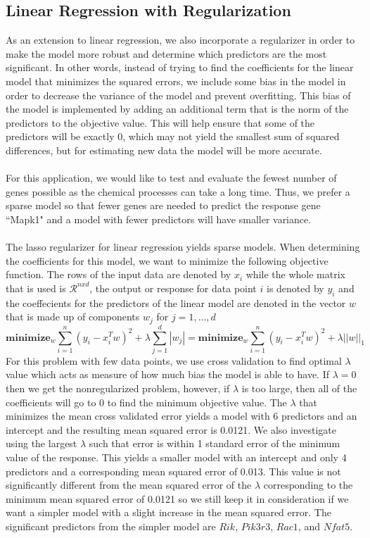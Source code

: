 \documentclass{article}
\begin{document}
\subsection{Linear Regression with Regularization}
As an extension to linear regression, we also incorporate a regularizer in order to make the model more robust and determine which predictors are the most significant.  In other words, instead of trying to find the coefficients for the linear model that minimizes the squared errors, we include some bias in the model in order to decrease the variance of the model and prevent overfitting.  This bias of the model is implemented by adding an additional term that is the norm of the predictors to the objective value. This will help ensure that some of the predictors will be exactly $0$, which may not yield the smallest sum of squared differences, but for estimating new data the model will be more accurate. \\
\null\\
For this application, we would like to test and evaluate the fewest number of genes possible as the chemical processes can take a long time.  Thus, we prefer a sparse model so that fewer genes are needed to predict the response gene ``Mapk1" and a model with fewer predictors will have smaller variance.\\
\null\\
The lasso regularizer for linear regression yields sparse models.  When determining the coefficients for this model, we want to minimize the following objective function.  The rows of the input data are denoted by $x_i$ while the whole matrix that is used is $\mathcal{R}^{nxd}$, the output or response for data point $i$ is denoted by $y_i$ and the coeffecients for the predictors of the linear model are denoted in the vector $w$ that is made up of components $w_j$ for $j=1,\dots,d$
\begin{equation}
	\textbf{minimize}_w \sum_{i=1}^n(y_i-x_i^Tw)^2+\lambda\sum_{j=1}^d |w_j| = \textbf{minimize}_w \sum_{i=1}^n(y_i-x_i^Tw)^2+\lambda||w||_1
\end{equation}
For this problem with few data points, we use cross validation to find optimal $\lambda$ value which acts as measure of how much bias the model is able to have.  If $\lambda = 0$ then we get the nonregularized problem, however, if $\lambda$ is too large, then all of the coefficients will go to $0$ to find the minimum objective value.  The $\lambda$ that minimizes the mean cross validated error yields a model with 6 predictors and an intercept and the resulting mean squared error is 0.0121.  We also investigate using the largest $\lambda$ such that error is within 1 standard error of the minimum value of the response.  This yields a smaller model with an intercept and only 4 predictors and a corresponding mean squared error of 0.013. This value is not significantly different from the mean squared error of the $\lambda$ corresponding to the minimum mean squared error of 0.0121 so we still keep it in consideration if we want a simpler model with a slight increase in the mean squared error.  The significant predictors from the simpler model are $Rik$, $Pik3r3$, $Rac1$, and $Nfat5$.  
\end{document}
